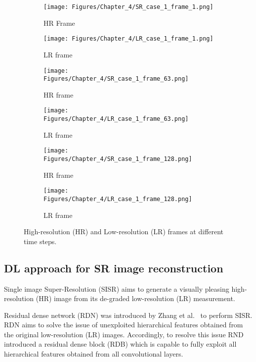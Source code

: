 \begin{figure} [!h]
	\centering
	\begin{subfigure}[b]{.48\textwidth}
		\centering
		\texttt{[image: Figures/Chapter\_4/SR\_case\_1\_frame\_1.png]}
		\caption{HR Frame}
		\label{fig:SR_1}
	\end{subfigure}
	\hfill
	\begin{subfigure}[b]{.48\textwidth}
		\centering
		\texttt{[image: Figures/Chapter\_4/LR\_case\_1\_frame\_1.png]}
		\caption{LR frame}
		\label{fig:LR_1}	
	\end{subfigure}
	\hfill
	\begin{subfigure}[b]{.48\textwidth}
		\centering
		\texttt{[image: Figures/Chapter\_4/SR\_case\_1\_frame\_63.png]}
		\caption{HR frame}
		\label{fig:SR_2}
	\end{subfigure}
	\hfill
	\begin{subfigure}[b]{.48\textwidth}
		\centering
		\texttt{[image: Figures/Chapter\_4/LR\_case\_1\_frame\_63.png]}
		\caption{LR frame}
		\label{fig:LR_2}	
	\end{subfigure}
	\hfill
	\begin{subfigure}[b]{.48\textwidth}
		\centering
		\texttt{[image: Figures/Chapter\_4/SR\_case\_1\_frame\_128.png]}
		\caption{HR frame}
		\label{fig:SR_3}
	\end{subfigure}
	\hfill
	\begin{subfigure}[b]{.48\textwidth}
		\centering
		\texttt{[image: Figures/Chapter\_4/LR\_case\_1\_frame\_128.png]}
		\caption{LR frame}
		\label{fig:LR_3}	
	\end{subfigure}
	\caption{High-resolution (HR) and Low-resolution (LR) frames at different time steps.}
	\label{fig:SR_LR}
\end{figure}
\newpage

\subsection{DL approach for SR image reconstruction}
\label{sec63}
Single image Super-Resolution (SISR) aims to generate a visually pleasing high-resolu\-tion (HR) image from its de-graded low-resolution (LR) measurement.

Residual dense network (RDN) was introduced by Zhang et al.~\cite{Zhang2018} to perform SISR.
RDN aims to solve the issue of unexploited hierarchical features obtained from the original low-resolution (LR) images.
Accordingly, to resolve this issue RND introduced a residual dense block (RDB) which is capable to fully exploit all hierarchical features obtained from all convolutional layers.

